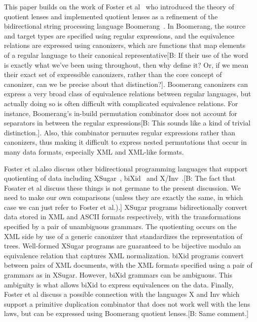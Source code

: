 \documentclass[acmsmall,review,anonymous]{acmart}
\newcommand{\FINISH}[3]{\ifdraft\textcolor{#1}{[#2: #3]}\fi}
\newcommand{\bcp}[1]{\FINISH{dkred}{B}{#1}}
\newcommand{\sam}[1]{\FINISH{dkpurple}{SM}{#1}}
\begin{document}

This paper builds on the work of Foster et al~\cite{quotientlenses} who
introduced the theory of quotient lenses and implemented quotient lenses as a
refinement of the bidirectional string processing language
Boomerang~\cite{boomerang}.  
In Boomerang, the source and target types are specified using regular
expressions, and the equivalence relations are expressed using canonizers, which
are functions that map elements of a regular language to their canonical
representative\bcp{If their use of the word is exactly what we've been using
throughout, then why define it?  Or, if we mean their exact set of
expressible canonizers, rather than the core concept of canonizer, can we be
precise about that distinction?}. Boomerang canonizers can express a very
broad class of 
equivalence relations between regular languages, but actually doing so is often
difficult with complicated equivalence relations. For instance, Boomerang's
in-build permutation combinator does not account for separators in between the
regular expressions\bcp{This sounds like a kind of trivial distinction.}. Also, this combinator permutes regular expressions rather
than canonizers, thus making it difficult to express nested permutations that
occur in many data formats, especially XML and XML-like formats.

Foster et al.\relax also discuss other bidirectional programming
languages that support quotienting of data including XSugar~\cite{xsugar},
biXid~\cite{bixid} and X/Inv~\cite{Hu2004,Mu2004,Mu2006}.\bcp{The fact that
  Fosater et al discuss these things is not germane to the present
  discussion.  We need to make our own comparisons (unless they are
  exactly the same, in which case we can just refer to Foster et al.).}
XSugar programs 
bidirectionally convert data stored in XML and ASCII formats respectively, with the
transformations specified by a pair of unambiguous grammars. The quotienting
occurs on the XML side by use of a generic canonizer that standardizes the
representation of trees. Well-formed XSugar programs are guaranteed to be
bijective modulo an equivalence relation that captures XML normalization. biXid
programs convert between pairs of XML documents, with the XML formats specified
using a pair of grammars as in XSugar. However, biXid grammars can be ambiguous.
This ambiguity is what allows biXid to express equivalences on the data.
Finally, Foster et al discuss a possible connection with the languages
X and Inv which support a primitive duplication combinator that does not work
well with the lens laws, but can be expressed using Boomerang quotient
lenses.\bcp{Same comment.}
\end{document}
